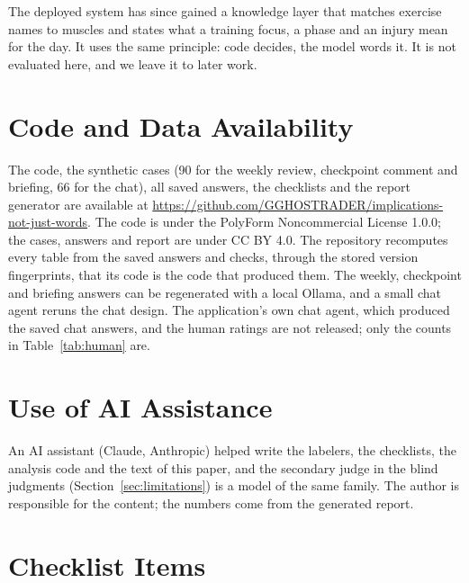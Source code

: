\documentclass[10pt,twocolumn]{article}
\begin{document}
The deployed system has since gained a knowledge layer that matches exercise names to muscles and states what a
training focus, a phase and an injury mean for the day. It uses the same principle: code decides, the model words it.
It is not evaluated here, and we leave it to later work.

\section*{Code and Data Availability}
The code, the synthetic cases (90 for the weekly review, checkpoint comment and briefing, 66 for the chat), all saved
answers, the checklists and the report generator are available at
\url{https://github.com/GGHOSTRADER/implications-not-just-words}. The code is under the PolyForm Noncommercial License
1.0.0; the cases, answers and report are under CC BY 4.0. The repository recomputes every table from the saved answers
and checks, through the stored version fingerprints, that its code is the code that produced them. The weekly, checkpoint
and briefing answers can be regenerated with a local Ollama, and a small chat agent reruns the chat design. The
application's own chat agent, which produced the saved chat answers, and the human ratings are not released; only the
counts in Table~\ref{tab:human} are.

\section*{Use of AI Assistance}
An AI assistant (Claude, Anthropic) helped write the labelers, the checklists, the analysis code and the text of this
paper, and the secondary judge in the blind judgments (Section~\ref{sec:limitations}) is a model of the same family. The
author is responsible for the content; the numbers come from the generated report.




\appendix
\onecolumn
\section{Checklist Items}
\label{app:items}
\end{document}

